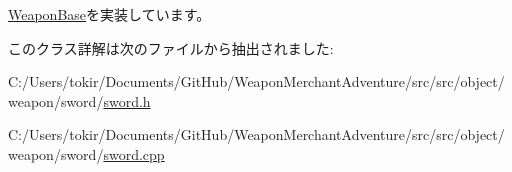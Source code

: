\mbox{\hyperlink{class_weapon_base_aa1e3d02353273ab72a71cc3a1563636a}{Weapon\+Base}}を実装しています。



このクラス詳解は次のファイルから抽出されました\+:\begin{DoxyCompactItemize}
\item 
C\+:/\+Users/tokir/\+Documents/\+Git\+Hub/\+Weapon\+Merchant\+Adventure/src/src/object/weapon/sword/\mbox{\hyperlink{sword_8h}{sword.\+h}}\item 
C\+:/\+Users/tokir/\+Documents/\+Git\+Hub/\+Weapon\+Merchant\+Adventure/src/src/object/weapon/sword/\mbox{\hyperlink{sword_8cpp}{sword.\+cpp}}\end{DoxyCompactItemize}

